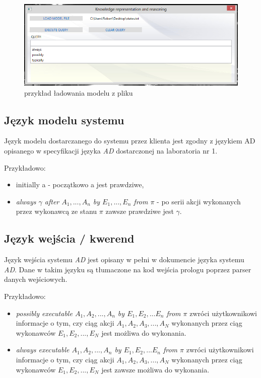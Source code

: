 \documentclass[a4paper]{article}
\begin{document}
        \begin{figure}[p]
            \centering
            \includegraphics[width=\textwidth]{images/acomp_3.jpg}
            \caption{przykład ładowania modelu z pliku}
            \label{fig:acomp3}
        \end{figure}

    \subsection{Język modelu systemu}
        Język modelu dostarczanego do systemu przez klienta jest zgodny
        z językiem AD opisanego w specyfikacji języka \textit{AD} dostarczonej
        na laboratoria nr 1.

        Przykładowo:

        \begin{itemize}
            \item initially a - początkowo a jest prawdziwe,
            \item \textit{always $\gamma$ after $A_1, ... , A_n$ by 
                $E_1, ..., E_n$ from $\pi$} - po serii akcji wykonanych przez
                wykonawcą ze stanu $\pi$ zawsze prawdziwe jest $\gamma$.
        \end{itemize}

    \subsection{Język wejścia / kwerend}
        Język wejścia systemu \textit{AD} jest opisany w pełni w dokumencie 
        języka systemu \textit{AD}. Dane w takim języku są tłumaczone na kod
        wejścia prologu poprzez parser danych wejściowych.


    Przykładowo:
      
    \begin{itemize}
        \item \textit{ possibly executable $A_1, A_2, ..., A_n$ by $E_1, E_2, ... E_n$ from $\pi$ }
            zwróci użytkownikowi informacje o tym, czy ciąg akcji 
            $A_1, A_2, A_3, ..., A_N$ wykonanych przez ciąg wykonawców
            $E_1, E_2, ..., E_N$ jest możliwa do wykonania.
        \item \textit{ always executable  $A_1, A_2, ..., A_n$ by $E_1, E_2, ... E_n$ from $\pi$  }
            zwróci użytkownikowi informacje o tym, czy ciąg akcji
            $A_1, A_2, A_3, ..., A_N$ wykonanych przez ciąg wykonawców
            $E_1, E_2, ..., E_N$ jest zawsze możliwa do wykonania.

    \end{itemize}
\end{document}

